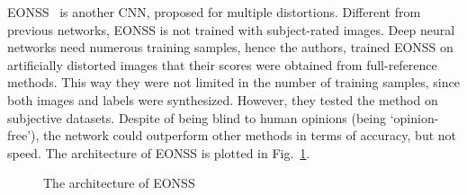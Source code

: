 EONSS~\cite{wang2019blind} is another CNN, proposed for multiple distortions. Different from previous networks, EONSS is not trained with subject-rated images. Deep neural networks need numerous training samples, hence the authors, trained EONSS on artificially distorted images that their scores were obtained from full-reference methods. This way they were not limited in the number of training samples, since both images and labels were synthesized. However, they tested the method on subjective datasets. Despite of being blind to human opinions (being `opinion-free'), the network could outperform other methods in terms of accuracy, but not speed. The architecture of EONSS is plotted in Fig.~\ref{fig:eonss}.
\begin{figure}
    \centering
    \caption{The architecture of EONSS}
    \label{fig:eonss}
\end{figure}
